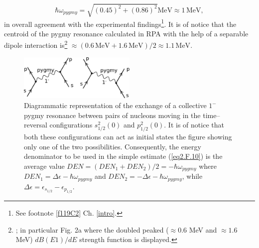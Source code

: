 \begin{equation}
\hbar \omega_{pygmy}=\sqrt{(0.45)^2+(0.86)^2}\text{MeV}\approx 1\, \text{MeV},
\end{equation}  
 in overall agreement with the experimental findings\footnote{See footnote \ref{f119C2} Ch. \ref{intro}.}. It is of notice that the centroid of the pygmy resonance calculated in  RPA with the help of a separable dipole interaction is\footnote{\cite{Barranco:01}; in particular  Fig. 2a where the doubled peaked ($\approx0.6$ MeV and $\approx1.6$ MeV) $dB(E1)/dE$ strength function is displayed.} $\approx (0.6\,\text{MeV}+ 1.6\, \text{MeV})/2\approx 1.1\, \text{MeV}$.
 \begin{figure}
 \centerline{\includegraphics*[width=0.5\textwidth,angle=0]{nutshell/figs/pigmy.pdf}}
 \caption{Diagrammatic representation of the exchange of a collective $1^-$ pygmy resonance between pairs of nucleons moving in the time--reversal configurations $s_{1/2}^2(0)$ and $p_{1/2}^2(0)$. It is of notice that both these configurations can act as initial states  the figure showing only one of the two possibilities. Consequently, the energy denominator to be used in the simple estimate (\ref{eq2.F.10}) is the average value $DEN=(DEN_1+DEN_2)/2=-\hbar\omega_{pygmy}$ where $DEN_1=\Delta \epsilon-\hbar\omega_{pygmy}$ and $DEN_2=-\Delta\epsilon-\hbar\omega_{pygmy}$, while $\Delta\epsilon=\epsilon_{s_{1/2}}-\epsilon_{p_{1/2}}$.}\label{pigmy}
 \end{figure}
